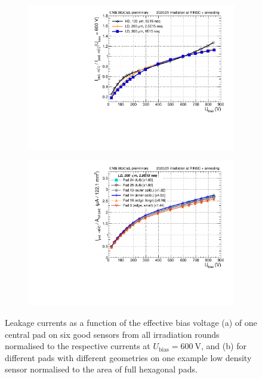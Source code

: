 \begin{figure}
	\captionsetup[subfigure]{aboveskip=-1pt,belowskip=-1pt}
	\centering
	\begin{subfigure}[b]{0.49\textwidth}
		\includegraphics[width=0.999\textwidth]{plots/channel_iv/channel_IV_sensors_sensors.pdf}
		\subcaption{
		}
		\label{plot:pad_IV_sensor}
	\end{subfigure}
	\hfill
	\begin{subfigure}[b]{0.49\textwidth}
		\includegraphics[width=0.999\textwidth]{plots/channel_iv/channel_IV_sensors_channels.pdf}
		\subcaption{
		}
		\label{plot:pad_IV_channels}
	\end{subfigure}
	\caption{
		Leakage currents as a function of the effective bias voltage (a) of one central pad on six good sensors from all irradiation rounds normalised to the respective currents at $U_\text{bias}=\SI{600}{\volt}$, 
		and (b) for different pads with different geometries on one example low density sensor normalised to the area of full hexagonal pads.
	}
\end{figure}



